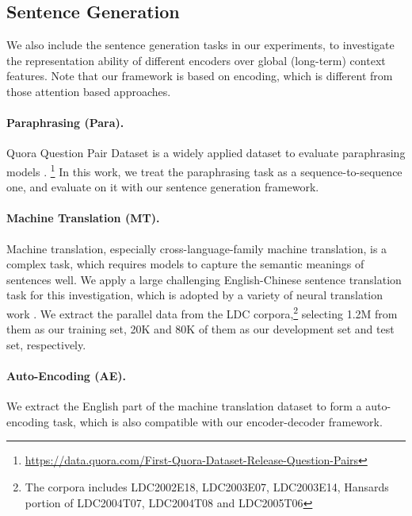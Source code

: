 \documentclass[11pt,a4paper]{article}
\begin{document}
\subsection{Sentence Generation}
We also include the sentence generation tasks in our experiments, to investigate the representation ability of different encoders over global (long-term) context features. 
Note that our framework is based on encoding, which is different from those attention based approaches. 
\paragraph{Paraphrasing (Para).}
Quora Question Pair Dataset is a widely applied dataset to evaluate  paraphrasing models \cite{wang2017bilateral,li2017paraphrase}. \footnote{\url{https://data.quora.com/First-Quora-Dataset-Release-Question-Pairs}}
In this work, we treat the paraphrasing task as a sequence-to-sequence one, and evaluate on it with our sentence generation framework.

\paragraph{Machine Translation (MT).} 
Machine translation, especially cross-language-family machine translation, is a complex task, which requires models to capture the semantic meanings of sentences well.
We apply a large challenging English-Chinese sentence translation task for this investigation, which is adopted by a variety of neural translation work \cite{tu2016modeling,li2017modeling,chen2017improved}.
We extract the parallel data from the LDC corpora,\footnote{The corpora includes LDC2002E18, LDC2003E07, LDC2003E14, Hansards portion of LDC2004T07, LDC2004T08 and LDC2005T06} selecting 1.2M from them as our training set, 20K and 80K of them as our development set and test set, respectively.

\paragraph{Auto-Encoding (AE).}
We extract the English part of the machine translation dataset to form a auto-encoding task, which is also compatible with our encoder-decoder framework.  
\end{document}
